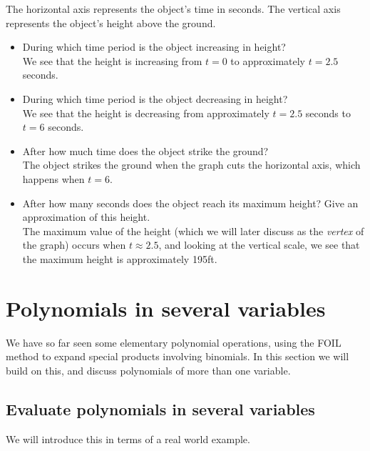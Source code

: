 \begin{myProof}
	The horizontal axis represents the object's time in seconds. The vertical axis represents
	the object's height above the ground.
	\begin{itemize}
		\item During which time period is the object increasing in height? \\
		We see that the height is increasing from $t=0$ to approximately
		$t=2.5$ seconds.
		\item During which time period is the object decreasing in height?\\
		We see that the height is decreasing from approximately $t=2.5$ seconds
		to $t=6$ seconds.
		\item After how much time does the object strike the ground?\\
		The object strikes the ground when the graph cuts the horizontal
		axis, which happens when $t=6$.
		\item After how many seconds does the object reach its maximum height? Give an
		approximation of this height.\\
		The maximum value of the height (which we will later discuss as the {\em \gls{vertex}} of
		the graph) occurs when $t \approx 2.5$, and looking at the vertical scale, we see
		that the maximum height is approximately 195ft.
	\end{itemize} 
\end{myProof}

\section{Polynomials in several variables}
%
We have so far seen some elementary polynomial operations, using the FOIL 
method to expand special products involving binomials. In this section we will build 
on this, and discuss polynomials of more than one \gls{variable}.

\subsection{Evaluate polynomials in several variables}
We will introduce this in terms of a real world example.

